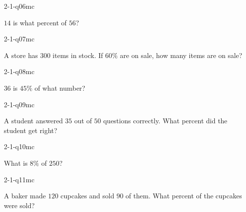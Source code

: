\begin{practiceQuestion}{2-1-q06}{mc}
\begin{questionText}
$14$ is what percent of $56$?
\end{questionText}
\end{practiceQuestion}

\begin{practiceQuestion}{2-1-q07}{mc}
\begin{questionText}
A store has $300$ items in stock. If $60\%$ are on sale, how many items are on sale?
\end{questionText}
\end{practiceQuestion}

\begin{practiceQuestion}{2-1-q08}{mc}
\begin{questionText}
$36$ is $45\%$ of what number?
\end{questionText}
\end{practiceQuestion}

\begin{practiceQuestion}{2-1-q09}{mc}
\begin{questionText}
A student answered $35$ out of $50$ questions correctly. What percent did the student get right?
\end{questionText}
\end{practiceQuestion}

\begin{practiceQuestion}{2-1-q10}{mc}
\begin{questionText}
What is $8\%$ of $250$?
\end{questionText}
\end{practiceQuestion}

\begin{practiceQuestion}{2-1-q11}{mc}
\begin{questionText}
A baker made $120$ cupcakes and sold $90$ of them. What percent of the cupcakes were sold?
\end{questionText}
\end{practiceQuestion}

